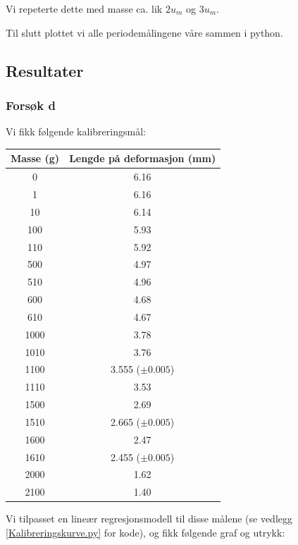 Vi repeterte dette med masse ca. lik $2u_m$ og $3u_m$.\medskip

Til slutt plottet vi alle periodemålingene våre sammen i python.


\subsection{Resultater} \label{Resultater_2}

\subsubsection*{Forsøk d}
Vi fikk følgende kalibreringsmål:

\begin{center}
\begin{tabular}{  | c | c |}
    \hline
    Masse (g) & Lengde på deformasjon (mm)\\
    \hline
    0 & 6.16\\
    \hline
    1 & 6.16\\
    \hline
    10 & 6.14\\
    \hline
    100 & 5.93\\
    \hline
    110 & 5.92\\
    \hline
    500 & 4.97\\
    \hline
    510 & 4.96\\
    \hline
    600 & 4.68\\
    \hline
    610 & 4.67\\
    \hline
    1000 & 3.78\\
    \hline
    1010 & 3.76\\
    \hline
    1100 & 3.555 ($\pm 0.005$)\\
    \hline
    1110 & 3.53\\
    \hline
    1500 & 2.69\\
    \hline
    1510 & 2.665 ($\pm 0.005$)\\
    \hline
    1600 & 2.47\\
    \hline
    1610 & 2.455 ($\pm 0.005$)\\
    \hline
    2000 & 1.62\\
    \hline
    2100 & 1.40\\
    \hline
\end{tabular}
\end{center}

Vi tilpasset en lineær regresjonsmodell til disse målene (se vedlegg \ref{Kalibreringskurve.py} for kode), og fikk følgende graf og utrykk:

